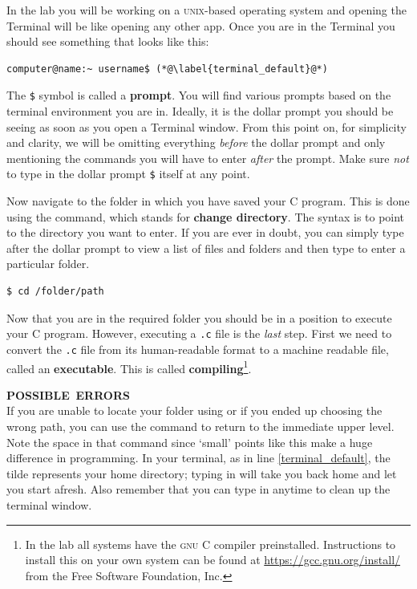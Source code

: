 \documentclass[11pt,oneside]{article}
\newcommand{\eb}[1]{\textbf{\scriptsize{\sffamily\addfontfeatures{LetterSpace=7} #1\\[.35em]}}}
\begin{document}
In the lab you will be working on a \textsc{unix}-based operating system and opening the Terminal will be like opening any other app. Once you are in the Terminal you should see something that looks like this:

\begin{lstlisting}
computer@name:~ username$ (*@\label{terminal_default}@*)
\end{lstlisting}

The \verb+$+ symbol is called a \textbf{prompt}. You will find various prompts based on the terminal environment you are in. Ideally, it is the dollar prompt you should be seeing as soon as you open a Terminal window. From this point on, for simplicity and clarity, we will be omitting everything \textit{before} the dollar prompt and only mentioning the commands you will have to enter \textit{after} the prompt. Make sure \textit{not} to type in the dollar prompt \verb+$+ itself at any point.

Now navigate to the folder in which you have saved your C program. This is done using the  command, which stands for \textbf{change directory}. The syntax is  to point to the directory you want to enter. If you are ever in doubt, you can simply type  after the dollar prompt to view a list of files and folders and then type  to enter a particular folder.

\begin{lstlisting}
$ cd /folder/path
\end{lstlisting}

Now that you are in the required folder you should be in a position to execute your C program. However, executing a \verb+.c+ file is the \textit{last} step. First we need to convert the \verb+.c+ file from its human-readable format to a machine readable file, called an \textbf{executable}. This is called \textbf{compiling}\footnote{In the lab all systems have the \textsc{gnu} C compiler preinstalled. Instructions to install this on your own system can be found at \url{https://gcc.gnu.org/install/} from the Free Software Foundation, Inc.}.

\begin{errorbox}
\eb{POSSIBLE\, ERRORS }
If you are unable to locate your folder using  or if you ended up choosing the wrong path, you can use the command  to return to the immediate upper level. Note the space in that command since `small' points like this make a huge difference in programming. In your terminal, as in line \ref{terminal_default}, the tilde \ebcbox{~} represents your home directory; typing in  will take you back home and let you start afresh. Also remember that you can type in  anytime to clean up the terminal window.
\end{errorbox}
\end{document}
